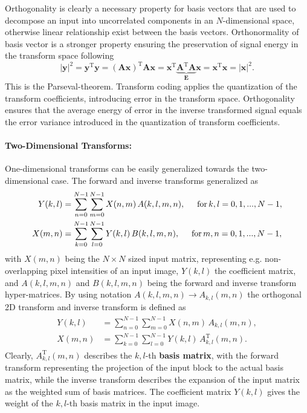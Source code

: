 Orthogonality is clearly a necessary property for basis vectors that are used to decompose an input into uncorrelated components in an $N$-dimensional space, otherwise linear relationship exist between the basis vectors.
Orthonormality of basis vector is a stronger property ensuring the preservation of signal energy in the transform space following
\begin{equation}
\left| \mathbf{y} \right|^2 = \mathbf{y}^{\mathrm{T}} \mathbf{y} = \left(\mathbf{A}\mathbf{x}\right)^{\mathrm{T}} \mathbf{\mathbf{A} \mathbf{x}} = \mathbf{x}^{\mathrm{T}} \underbrace{ \mathbf{A}^{\mathrm{T}}\mathbf{A} }_{\mathbf{E}} \mathbf{x} = \mathbf{x}^{\mathrm{T}} \mathbf{x}  =| \mathbf{x} |^2.
\end{equation}
This is the Parseval-theorem.
Transform coding applies the quantization of the transform coefficients, introducing error in the transform space.
Orthogonality ensures that the average energy of error in the inverse transformed signal equals the error variance introduced in the quantization of transform coefficients.


\paragraph*{Two-Dimensional Transforms:\\}
One-dimensional transforms can be easily generalized towards the two-dimensional case.
The forward and inverse transforms generalized as
\begin{align}
\begin{split}
Y(k,l) &= \sum_{n=0}^{N-1} \sum_{m=0}^{N-1} X(n,m) \, A(k,l,m,n), \hspace{5mm} \text{for} \, k,l = 0,1,...,N-1,
\\
X(m,n) &= \sum_{k=0}^{N-1} \sum_{l=0}^{N-1} Y(k,l) \, B(k,l,m,n), \hspace{5mm} \text{for} \, m,n = 0,1,...,N-1,
\end{split}
\label{Eq:2D_Tr}
\end{align}
with $X(m,n)$ being the $N\times N$ sized input matrix, representing e.g. non-overlapping pixel intensities of an input image, $Y(k,l)$ the coefficient matrix, and $A(k,l,m,n)$ and $B(k,l,m,n)$ being the forward and inverse transform hyper-matrices.
By using notation $A(k,l,m,n) \rightarrow A_{k,l}(m,n)$ the orthogonal 2D transform and inverse transform is defined as
\begin{align}
\begin{split}
Y(k,l) &= \sum_{n=0}^{N-1} \sum_{m=0}^{N-1} X(n,m) \, A_{k,l}(m,n), 
\\
X(m,n) &= \sum_{k=0}^{N-1} \sum_{l=0}^{N-1} Y(k,l) \, A^{\mathrm{T}}_{k,l}(m,n).
\end{split}
\end{align}
Clearly, $A_{k,l}^{\mathrm{T}}(m,n)$ describes the $k,l$-th \textbf{basis matrix}, with the forward transform representing the projection of the input block to the actual basis matrix, while the inverse transform describes the expansion of the input matrix as the weighted sum of basis matrices.
The coefficient matrix $Y(k,l)$ gives the weight of the $k,l$-th basis matrix in the input image.

